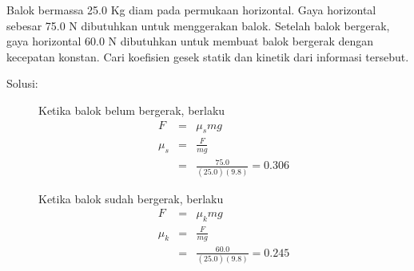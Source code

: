 \item
Balok bermassa 25.0 Kg diam pada permukaan horizontal. Gaya horizontal sebesar 75.0 N dibutuhkan untuk menggerakan balok. Setelah balok bergerak, gaya horizontal 60.0 N dibutuhkan untuk membuat balok bergerak dengan kecepatan konstan. Cari koefisien gesek statik dan kinetik dari informasi tersebut.
\begin{description}
    \item[Solusi:]

Ketika balok belum bergerak, berlaku
\begin{eqnarray*}
F&=&\mu_{s}mg \\
\mu_{s}&=&\frac{F}{mg}\\
&=&\frac{75.0}{(25.0)(9.8)}=0.306
\end{eqnarray*}

Ketika balok sudah bergerak, berlaku
\begin{eqnarray*}
F&=&\mu_{k}mg \\
\mu_{k}&=&\frac{F}{mg}\\
&=&\frac{60.0}{(25.0)(9.8)}=0.245
\end{eqnarray*}

\end{description}
